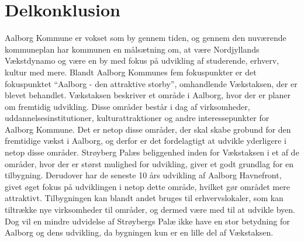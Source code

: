 \section{Delkonklusion}
Aalborg Kommune er vokset som by gennem tiden, og gennem den nuværende kommuneplan har kommunen en målsætning om, at være Nordjyllands Vækstdynamo og være en by med fokus på udvikling af studerende, erhverv, kultur med mere. 
\newline \indent{     }  Blandt Aalborg Kommunes fem fokuspunkter er det fokuspunktet “Aalborg - den attraktive storby”, omhandlende Vækstaksen, der er blevet behandlet. Vækstaksen beskriver et område i Aalborg, hvor der er planer om fremtidig udvikling. Disse områder består i dag af virksomheder, uddannelsesinstitutioner, kulturattraktioner og andre interessepunkter for Aalborg Kommune. Det er netop disse områder, der skal skabe grobund for den fremtidige vækst i Aalborg, og derfor er det fordelagtigt at udvikle yderligere i netop disse områder.
\newline \indent{     }  Strøyberg Palæs beliggenhed inden for Vækstaksen i et af de områder, hvor der er størst mulighed for udvikling, giver et godt grundlag for en tilbygning. Derudover har de seneste 10 års udvikling af Aalborg Havnefront, givet øget fokus på udviklingen i netop dette område, hvilket  gør området mere attraktivt. Tilbygningen kan blandt andet bruges til erhvervslokaler, som kan tiltrække nye virksomheder til områder, og dermed være med til at udvikle byen.  Dog vil en mindre udvidelse af Strøybergs Palæ ikke have en stor betydning for Aalborg og dens udvikling, da bygningen kun er en lille del af Vækstaksen.
